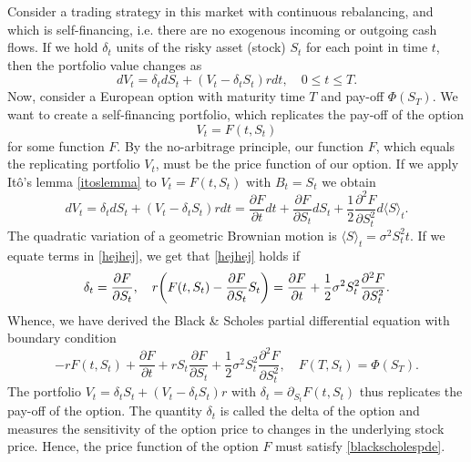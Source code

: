 Consider a trading strategy in this market with continuous rebalancing, and which is self-financing, i.e. there are no exogenous incoming or outgoing cash flows. If we hold $\delta_{t}$ units of the risky asset (stock) $S_t$ for each point in time $t$, then the portfolio value changes as
\begin{equation}
    dV_{t}=\delta_{t}dS_{t}+(V_{t}-\delta_{t}S_{t})rdt,\quad 0\leq t\leq T.
\end{equation}
Now, consider a European option with maturity time $T$ and pay-off $\Phi(S_{T})$. We want to create a self-financing portfolio, which replicates the pay-off of the option
\begin{equation}
    V_{t}=F(t,S_{t})
\end{equation}
for some function $F$. By the no-arbitrage principle, our function $F$, which equals the replicating portfolio $V_t$, must be the price function of our option. If we apply Itô's lemma \eqref{itoslemma} to $V_{t}=F(t,S_{t})$ with $B_{t}=S_{t}$ we obtain
\begin{equation}\label{hejhej}
    dV_{t}=\delta_{t}dS_{t}+(V_{t}-\delta_{t}S_{t})rdt=\frac{\partial F}{\partial t}dt+\frac{\partial F}{\partial S_{t}}dS_{t}+\frac{1}{2}\frac{\partial^{2}F}{\partial S_{t}^{2}}d\langle S\rangle_{t}.
\end{equation}
The quadratic variation of a geometric Brownian motion is $\langle S\rangle_{t}=\sigma^{2}S_{t}^{2}t$. If we equate terms in \eqref{hejhej}, we get that \eqref{hejhej} holds if
\begin{equation}
    \delta_{t}=\frac{\partial F}{\partial S_{t}},\hspace{10 pt} r\left(F(t,S_{t})-\frac{\partial F}{\partial S_{t}}S_{t}\right)=\frac{\partial F}{\partial t}+\frac{1}{2}\sigma^{2}S_{t}^{2}\frac{\partial^{2}F}{\partial S_{t}^{2}}.
\end{equation}
Whence, we have derived the Black \& Scholes partial differential equation with boundary condition
\begin{equation}\label{blackscholespde}
    -rF(t,S_{t})+\frac{\partial F}{\partial t}+rS_{t}\frac{\partial F}{\partial S_{t}}+\frac{1}{2}\sigma^{2}S_{t}^{2}\frac{\partial^{2}F}{\partial S_{t}^{2}},\quad F(T,S_{t})=\Phi(S_{T}).
\end{equation}
The portfolio $V_{t}=\delta_{t}S_{t}+(V_{t}-\delta_{t}S_{t})r$ with $\delta_{t}=\partial_{S_{t}}F(t,S_{t})$ thus replicates the pay-off of the option. The quantity $\delta_{t}$ is called the delta of the option and measures the sensitivity of the option price to changes in the underlying stock price. Hence, the price function of the option $F$ must satisfy \eqref{blackscholespde}. 

